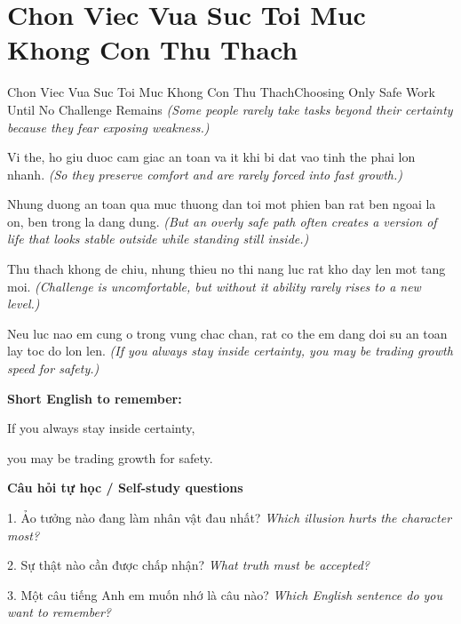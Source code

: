 \section{Chon Viec Vua Suc Toi Muc Khong Con Thu Thach}
\begin{truyen}{Chon Viec Vua Suc Toi Muc Khong Con Thu Thach}{Choosing Only Safe Work Until No Challenge Remains}
\textit{(Some people rarely take tasks beyond their certainty because they fear exposing weakness.)}

Vi the, ho giu duoc cam giac an toan va it khi bi dat vao tinh the phai lon nhanh.
\textit{(So they preserve comfort and are rarely forced into fast growth.)}

Nhung duong an toan qua muc thuong dan toi mot phien ban rat ben ngoai la on, ben trong la dang dung.
\textit{(But an overly safe path often creates a version of life that looks stable outside while standing still inside.)}

Thu thach khong de chiu, nhung thieu no thi nang luc rat kho day len mot tang moi.
\textit{(Challenge is uncomfortable, but without it ability rarely rises to a new level.)}

\end{truyen}

\begin{baihoc}
Neu luc nao em cung o trong vung chac chan, rat co the em dang doi su an toan lay toc do lon len.
\textit{(If you always stay inside certainty, you may be trading growth speed for safety.)}
\end{baihoc}

\begin{ghinhoanh}
\textbf{Short English to remember:}

If you always stay inside certainty,

you may be trading growth for safety.

\end{ghinhoanh}

\begin{tuhocnhanh}
\textbf{Câu hỏi tự học / Self-study questions}

1. Ảo tưởng nào đang làm nhân vật đau nhất? \textit{Which illusion hurts the character most?}

2. Sự thật nào cần được chấp nhận? \textit{What truth must be accepted?}

3. Một câu tiếng Anh em muốn nhớ là câu nào? \textit{Which English sentence do you want to remember?}
\end{tuhocnhanh}
\ngancach

